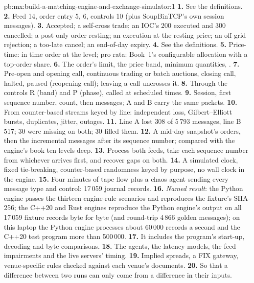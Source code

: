 \begin{solution}{pb:mx:build-a-matching-engine-and-exchange-simulator:1}
\textbf{1.} See the definitions.
\textbf{2.} Feed 14, order entry 5,  6, controls 10 (plus SoupBinTCP's own session messages).
\textbf{3.} Accepted; a self-cross trade; an IOC's 200 executed and 300 cancelled; a post-only order resting; an execution at the resting price; an
off-grid rejection; a too-late cancel; an end-of-day expiry.
\textbf{4.} See the definitions.
\textbf{5.} Price-time: in time order at the level; pro rata: Book~1's configurable allocation with a top-order share.
\textbf{6.} The order's limit, the price band, minimum quantities, .
\textbf{7.} Pre-open and opening call, continuous trading or batch auctions, closing call, halted, paused (reopening call); leaving a call uncrosses it.
\textbf{8.} Through the controls R (band) and P (phase), called at scheduled times.
\textbf{9.} Session, first sequence number, count, then messages; A and B carry the same packets.
\textbf{10.} From counter-based streams keyed by line: independent loss, Gilbert--Elliott bursts, duplicates, jitter, outages.
\textbf{11.} Line A lost 308 of 5\,793 messages, line B 517; 30 were missing on both; 30  filled them.
\textbf{12.} A mid-day snapshot's orders, then the incremental messages after its sequence number; compared with the engine's book ten levels deep.
\textbf{13.} Process both feeds, take each sequence number from whichever arrives first, and recover gaps on both.
\textbf{14.} A simulated clock, fixed tie-breaking, counter-based randomness keyed by purpose, no wall clock in the engine.
\textbf{15.} Four minutes of tape flow plus a chaos agent sending every message type and control: 17\,059 journal records.
\textbf{16.} \emph{Named result}: the Python engine passes the thirteen engine-rule scenarios and reproduces the fixture's SHA-256; the C++20 and Rust engines
reproduce the Python engine's output on all 17\,059 fixture records byte for byte (and round-trip 4\,866 golden messages); on this laptop the Python engine
processes about 60\,000 records a second and the C++20 test program more than 500\,000.
\textbf{17.} It includes the program's start-up, decoding and byte comparisons.
\textbf{18.} The agents, the latency models, the feed impairments and the live servers' timing.
\textbf{19.} Implied spreads, a FIX gateway, venue-specific rules checked against each venue's documents.
\textbf{20.} So that a difference between two runs can only come from a difference in their inputs.
\end{solution}

